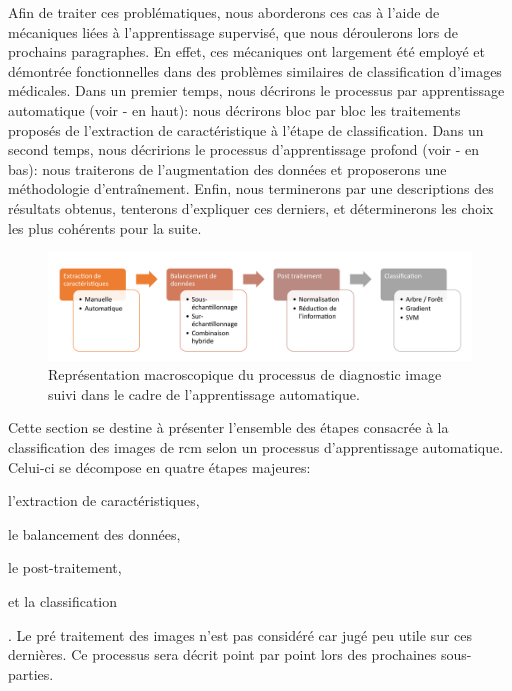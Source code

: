 Afin de traiter ces problématiques, nous aborderons ces cas à l'aide de mécaniques liées à l'apprentissage supervisé, que nous déroulerons lors de prochains paragraphes. En effet, ces mécaniques ont largement été employé et démontrée fonctionnelles dans des problèmes similaires de classification d'images médicales. Dans un premier temps, nous décrirons le processus par apprentissage automatique (voir  - en haut): nous décrirons bloc par bloc les traitements proposés de l'extraction de caractéristique à l'étape de classification. Dans un second temps, nous décririons le processus d'apprentissage profond (voir  - en bas): nous traiterons de l'augmentation des données et proposerons une méthodologie d'entraînement. Enfin, nous terminerons par une descriptions des résultats obtenus, tenterons d'expliquer ces derniers, et déterminerons les choix les plus cohérents pour la suite.\par

\begin{figure}[H]
\centering
    \includegraphics[width=\linewidth]{contents/chapter_4/resources/scheme_macro_pipeline_machine.pdf}
    \caption{Représentation macroscopique du processus de diagnostic image suivi dans le cadre de l'apprentissage automatique.}
    \label{fig:scheme_macro_pipeline}
\end{figure}\par

Cette section se destine à présenter l'ensemble des étapes consacrée à la classification des images de \gls{rcm} selon un processus d'apprentissage automatique. Celui-ci se décompose en quatre étapes majeures:
\begin{inlinerate}
    \item l'extraction de caractéristiques,
    \item le balancement des données,
    \item le post-traitement,
    \item et la classification
\end{inlinerate}.
Le pré traitement des images n'est pas considéré car jugé peu utile sur ces dernières. Ce processus sera décrit point par point lors des prochaines sous-parties.\par
\newpage

